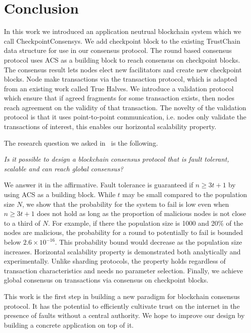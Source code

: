 \chapter{Conclusion}
\label{ch:conclusion}

In this work we introduced an application neutrual blockchain system which we call CheckpointConsensys.
We add checkpoint block to the existing TrustChain data structure for use in our consensus protocol.
The round based consensus protocol uses ACS as a building block to reach consensus on checkpoint blocks.
The consensus result lets nodes elect new facilitators and create new checkpoint blocks.
Node make transactions via the transaction protocol,
which is adapted from an existing work called True Halves.
We introduce a validation protocol which ensure that if agreed fragments for some transaction exists,
then nodes reach agreement on the validity of that transaction.
The novelty of the validation protocol is that it uses point-to-point communication,
i.e. nodes only validate the transactions of interest,
this enables our horizontal scalability property.

The research question we asked in~ is the following.
\begin{displayquote}
\emph{Is it possible to design a blockchain consensus protocol that is fault tolerant, scalable and can reach global consensus?}
\end{displayquote}
We answer it in the affirmative.
Fault tolerance is guaranteed if $n \ge 3t + 1$ by using ACS as a building block.
While $t$ may be small compared to the population size $N$,
we show that the probability for the system to fail is low even when $n \ge 3t + 1$ does not hold as long as the proportion of malicious nodes is not close to a third of $N$.
For example, if there the population size is 1000 and 20\% of the nodes are malicious,
the probability for a round to potentially to fail is bounded below $2.6 \times 10^{-16}$.
This probability bound would decrease as the population size increases.
Horizontal scalability property is demonstrated both analytically and experimentally.
Unlike sharding protocols, the property holds regardless of transaction characteristics and needs no parameter selection.
Finally, we achieve global consensus on transactions via consensus on checkpoint blocks.

This work is the first step in building a new paradigm for blockchain consensus protocol.
It has the potential to efficiently cultivate trust on the internet in the presence of faults without a central authority.
We hope to improve our design by building a concrete application on top of it.

